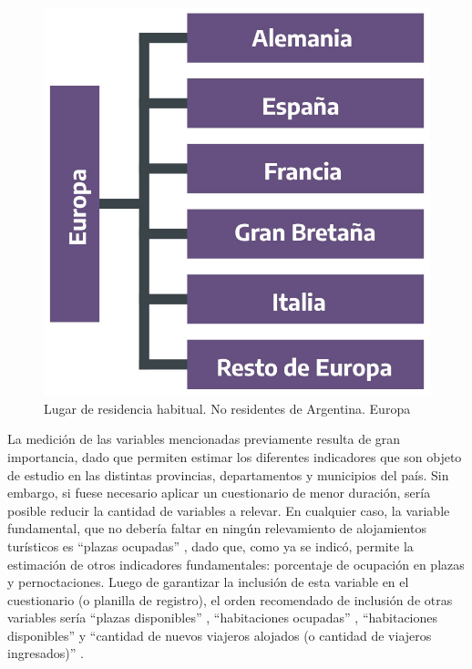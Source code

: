 \documentclass[
]{book}
\begin{document}
\begin{figure}

{\centering \includegraphics[width=1\linewidth]{imagenes/figura_2_2_2} 

}

\caption{Lugar de residencia habitual. No residentes de Argentina. Europa}\label{fig:europa}
\end{figure}

La medición de las variables mencionadas previamente resulta de gran importancia, dado que permiten estimar los diferentes indicadores que son objeto de estudio en las distintas provincias, departamentos y municipios del país. Sin embargo, si fuese necesario aplicar un cuestionario de menor duración, sería posible reducir la cantidad de variables a relevar. En cualquier caso, la variable fundamental, que no debería faltar en ningún relevamiento de alojamientos turísticos es ``plazas ocupadas'' , dado que, como ya se indicó, permite la estimación de otros indicadores fundamentales: porcentaje de ocupación en plazas y pernoctaciones. Luego de garantizar la inclusión de esta variable en el cuestionario (o planilla de registro), el orden recomendado de inclusión de otras variables sería ``plazas disponibles'' , ``habitaciones ocupadas'' , ``habitaciones disponibles'' y ``cantidad de nuevos viajeros alojados (o cantidad de viajeros ingresados)'' .
\end{document}
